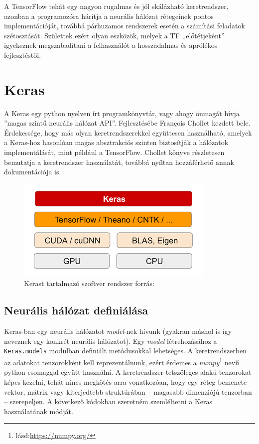A TensorFlow tehát egy nagyon rugalmas és jól skálázható keretrendszer, azonban a programozóra hárítja a neurális hálózat rétegeinek pontos implementációját, továbbá párhuzamos rendszerek esetén a számítási feladatok szétosztását. Születtek ezért olyan eszközök, melyek a TF ,,előtétjeként'' igyekeznek megszabadítani a felhasználót a hosszadalmas és aprólékos fejlesztéstől.

\section{Keras}
A Keras egy python nyelven írt programkönyvtár, vagy ahogy önmagát hívja ''magas szintű neurális hálózat API''\cite{web:Keras}. Fejlesztésébe François Chollet kezdett bele. Érdekessége, hogy más olyan keretrendszerekkel együttesen használható, amelyek a Keras-hoz hasonlóan magas absztrakciós szinten biztosítják a hálózatok implementálását, mint például a TensorFlow.
Chollet könyve részletesen bemutatja a keretrendszer használatát, továbbá nyíltan hozzáférhető annak dokumentációja is.\cite{chollet}\cite{web:Keras}
\begin{figure}[h]
	\centering
	\includegraphics[width=0.5\linewidth]{fig/keras_software_stack}
	\caption{Kerast tartalmazó szoftver rendszer \footnotesize forrás:\cite{chollet}}
	\label{fig:kerassoftwarestack}
\end{figure}

\subsection{Neurális hálózat definiálása}
Keras-ban egy neurális hálózatot \emph{model}-nek hívunk (gyakran máshol is így neveznek egy konkrét neurális hálózatot). Egy \emph{model} létrehozásához a \verb|Keras.models| modulban definiált metódusokkal lehetséges. A keretrendszerben az adatokat tenzorokként kell reprezentálnunk, ezért érdemes a \emph{numpy}\footnote{lásd:\url{https://numpy.org/}} nevű python csomaggal együtt használni. A keretrendszer tetszőleges alakú tenzorokat képes kezelni, tehát nincs megkötés arra vonatkozóan, hogy egy réteg bemenete vektor, mátrix vagy kiterjedtebb struktúrában -- magasabb dimenziójú tenzorban -- szerepeljen. A következő kódokban szeretném szemléltetni a Keras használatának módját.

